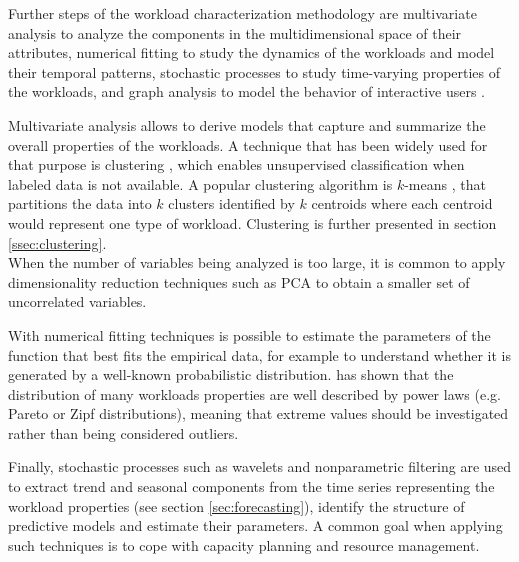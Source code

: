 \documentclass[a4paper, 12pt]{article} %
\begin{document}
	Further steps of the workload characterization methodology are multivariate analysis to analyze the components in the multidimensional space of their attributes, numerical fitting to study the dynamics of the workloads and model their temporal patterns, stochastic processes to study time-varying properties of the workloads, and graph analysis to model the behavior of interactive users \cite{WorkloadCharacterization}.
	
	Multivariate analysis allows to derive models that capture and summarize the overall properties of the workloads. A technique that has been widely used for that purpose is clustering \cite{ClusteringSurvey}, which enables unsupervised classification when labeled data is not available. A popular clustering algorithm is $k$-means \cite{ClusteringSurvey}, that partitions the data into $k$ clusters identified by $k$ centroids where each centroid would represent one type of workload. Clustering is further presented in section \ref{ssec:clustering}.\\
	When the number of variables being analyzed is too large, it is common to apply dimensionality reduction techniques such as PCA \cite{PCA} to obtain a smaller set of uncorrelated variables.
	
	With numerical fitting techniques is possible to estimate the parameters of the function that best fits the empirical data, for example to understand whether it is generated by a well-known probabilistic distribution. \cite{WorkloadsPowerLaw} has shown that the distribution of many workloads properties are well described by power laws (e.g. Pareto or Zipf distributions), meaning that extreme values should be investigated rather than being considered outliers.
	
	Finally, stochastic processes such as wavelets and nonparametric filtering are used to extract trend and seasonal components from the time series representing the workload properties (see section \ref{sec:forecasting}), identify the structure of predictive models and estimate their parameters. A common goal when applying such techniques is to cope with capacity planning and resource management.
	
\end{document}
